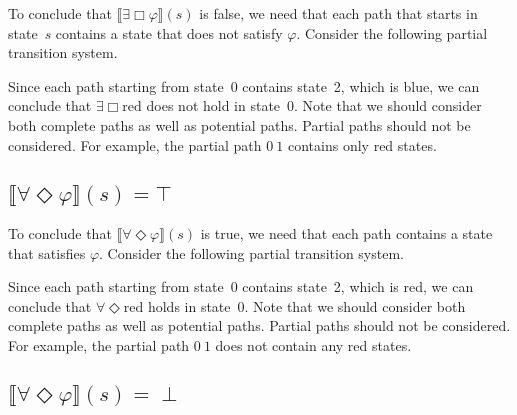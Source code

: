 \documentclass[12pt]{article}
\newcommand{\always}{\Box}
\newcommand{\eventually}{\Diamond}
\theoremstyle{definition}
\newcommand{\satisfaction}[1]{\llbracket #1 \rrbracket}
\newenvironment{franck}{\color{red}}{\color{black}}
\begin{document}
\begin{franck}
To conclude that $\satisfaction{\exists \always \varphi}(s)$ is false, we need that each path that starts in state~$s$ contains a state that does not satisfy $\varphi$.  Consider the following partial transition system.
\begin{center}
\end{center}
Since each path starting from state~0 contains state~2, which is blue, we can conclude that $\exists \always \mbox{red}$ does not hold in state~0.  Note that we should consider both complete paths as well as potential paths.  Partial paths should not be considered.  For example, the partial path $0\ 1$ contains only red states.

\subsection*{$\satisfaction{\forall \eventually \varphi}(s) = \top$}

To conclude that $\satisfaction{\forall \eventually \varphi}(s)$ is true, we need that each path contains a state that satisfies $\varphi$.  Consider the following partial transition system.
\begin{center}
\end{center}
Since each path starting from state~0 contains state~2, which is red, we can conclude that $\forall \eventually \mbox{red}$ holds in state~0.  Note that we should consider both complete paths as well as potential paths.  Partial paths should not be considered.  For example, the partial path $0\ 1$ does not contain any red states.

\subsection*{$\satisfaction{\forall \eventually \varphi}(s) = \perp$}


\end{franck}
\end{document}
